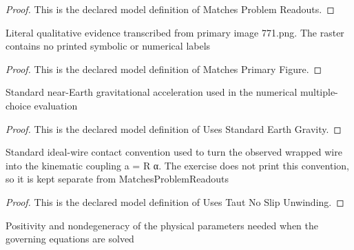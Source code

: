 \begin{proof}
  This is the declared model definition of Matches Problem Readouts.
\end{proof}
\begin{definition}
  \label{def:physics:phyx-mini-0771:phyxminiproblems-problemphyxmini0771-matchesprimaryfigure}
  Literal qualitative evidence transcribed from primary image 771.png. The raster contains no printed symbolic or numerical labels
\end{definition}
\begin{proof}
  This is the declared model definition of Matches Primary Figure.
\end{proof}
\begin{definition}
  \label{def:physics:phyx-mini-0771:phyxminiproblems-problemphyxmini0771-usesstandardearthgravity}
  Standard near-Earth gravitational acceleration used in the numerical multiple-choice evaluation
\end{definition}
\begin{proof}
  This is the declared model definition of Uses Standard Earth Gravity.
\end{proof}
\begin{definition}
  \label{def:physics:phyx-mini-0771:phyxminiproblems-problemphyxmini0771-usestautnoslipunwinding}
  Standard ideal-wire contact convention used to turn the observed wrapped wire into the kinematic coupling a = R α. The exercise does not print this convention, so it is kept separate from MatchesProblemReadouts
\end{definition}
\begin{proof}
  This is the declared model definition of Uses Taut No Slip Unwinding.
\end{proof}
\begin{definition}
  \label{def:physics:phyx-mini-0771:phyxminiproblems-problemphyxmini0771-hasphysicalparameters}
  Positivity and nondegeneracy of the physical parameters needed when the governing equations are solved
\end{definition}
